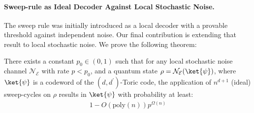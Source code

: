   \paragraph{Sweep-rule as Ideal Decoder Against Local Stochastic Noise.} 
The sweep rule was initially introduced as a local decoder with a provable threshold \cite{Kubica_2019} against independent noise. Our final contribution is extending that result to local stochastic noise. We prove the following theorem:
\begin{theorem*} 
    There exists a constant $p_{0} \in (0,1)$ such that for any local stochastic noise channel $\mathcal{N}_{\mathcal{E}}$ with rate $p < p_{0}$, and a quantum state $\rho = \mathcal{N}_{\mathcal{E}}(\ket{\psi})$, where $\ket{\psi}$ is a codeword of the $(d,d^{\prime})$-Toric code, the application of $n^{d+1}$ (ideal) sweep-cycles on $\rho$ results in $\ket{\psi}$ with probability at least:
\begin{equation*}
  \begin{split}
    1 -   O \left( \text{poly}(n) \right)  p^{\Omega(n)} 
  \end{split}
\end{equation*}
  \end{theorem*} 

